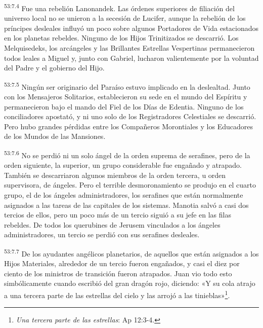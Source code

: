 \par
\textsuperscript{53:7.4} Fue una rebelión Lanonandek. Las órdenes superiores de filiación del universo local no se unieron a la secesión de Lucifer, aunque la rebelión de los príncipes desleales influyó un poco sobre algunos Portadores de Vida estacionados en los planetas rebeldes. Ninguno de los Hijos Trinitizados se descarrió. Los Melquisedeks, los arcángeles y las Brillantes Estrellas Vespertinas permanecieron todos leales a Miguel y, junto con Gabriel, lucharon valientemente por la voluntad del Padre y el gobierno del Hijo.

\par
\textsuperscript{53:7.5} Ningún ser originario del Paraíso estuvo implicado en la deslealtad. Junto con los Mensajeros Solitarios, establecieron su sede en el mundo del Espíritu y permanecieron bajo el mando del Fiel de los Días de Edentia. Ninguno de los conciliadores apostató, y ni uno solo de los Registradores Celestiales se descarrió. Pero hubo grandes pérdidas entre los Compañeros Morontiales y los Educadores de los Mundos de las Mansiones.

\par
\textsuperscript{53:7.6} No se perdió ni un solo ángel de la orden suprema de serafines, pero de la orden siguiente, la superior, un grupo considerable fue engañado y atrapado. También se descarriaron algunos miembros de la orden tercera, u orden supervisora, de ángeles. Pero el terrible desmoronamiento se produjo en el cuarto grupo, el de los ángeles administradores, los serafines que están normalmente asignados a las tareas de las capitales de los sistemas. Manotia salvó a casi dos tercios de ellos, pero un poco más de un tercio siguió a su jefe en las filas rebeldes. De todos los querubines de Jerusem vinculados a los ángeles administradores, un tercio se perdió con sus serafines desleales.

\par
\textsuperscript{53:7.7} De los ayudantes angélicos planetarios, de aquellos que están asignados a los Hijos Materiales, alrededor de un tercio fueron engañados, y casi el diez por ciento de los ministros de transición fueron atrapados. Juan vio todo esto simbólicamente cuando escribió del gran dragón rojo, diciendo: «Y su cola atrajo a una tercera parte de las estrellas del cielo y las arrojó a las tinieblas»\footnote{\textit{Una tercera parte de las estrellas}: Ap 12:3-4.}.

